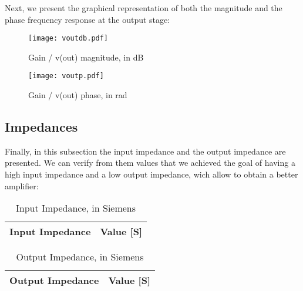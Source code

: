  Next, we present the graphical representation of both the magnitude and the phase frequency response at the output stage:
 

\begin{figure}[H] \centering
\texttt{[image: voutdb.pdf]}
\caption{Gain / v(out) magnitude, in dB}
\label{fig:voutdb}
\end{figure}

\begin{figure}[H] \centering
\texttt{[image: voutp.pdf]}
\caption{Gain / v(out) phase, in rad}
\label{fig:voutp}
\end{figure}


\subsection{Impedances}
\label{impedances}
Finally, in this subsection the input impedance and the output impedance are presented. We can verify from them values that we achieved the goal of having a high input impedance and a low output impedance, wich allow to obtain a better amplifier:


\begin{table}[H]
  \centering
  \begin{tabular}{|l|r|}
    \hline    
    {\bf Input Impedance} & {\bf Value [S]} \\ \hline
    
  \end{tabular}
  \caption{Input Impedance, in Siemens}
  \label{tab:input_z}
\end{table}


\begin{table}[H]
  \centering
  \begin{tabular}{|l|r|}
    \hline    
    {\bf Output Impedance} & {\bf Value [S]} \\ \hline
    
  \end{tabular}
  \caption{Output Impedance, in Siemens}
  \label{tab:output_z}
\end{table}



